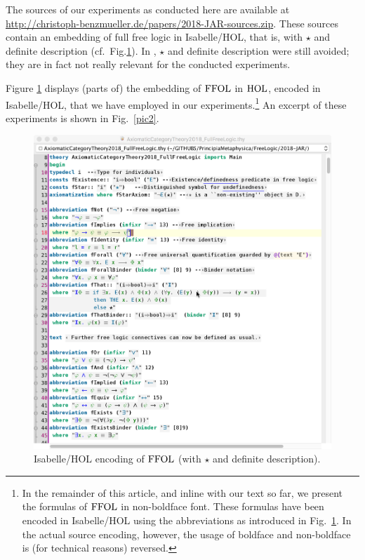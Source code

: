 The sources of our experiments as conducted here are available at
\url{http://christoph-benzmueller.de/papers/2018-JAR-sources.zip}.
These sources contain an embedding of full free logic in Isabelle/HOL,
that is, with $\star$ and definite description
(cf.~Fig.\ref{pic1}). In \cite{ArXiv}, $\star$ and definite
description were still avoided; they are in fact not really 
relevant for the conducted experiments.

Figure \ref{pic1} displays (parts of) the embedding of $\text{\textrm{FFOL}}$ in
$\text{\textrm{HOL}}$, encoded in Isabelle/HOL, that we have employed in our
experiments.\footnote{In the remainder of this article, and inline
  with our text so far,  we present the formulas of
  $\text{\textrm{FFOL}}$ in non-boldface font. These formulas have been encoded in Isabelle/HOL using the
  abbreviations as introduced in Fig.~\ref{pic1}. In the actual source
  encoding, however, the usage of boldface and non-boldface is
  (for technical reasons) reversed.} 
An excerpt of these experiments is shown in Fig.~\ref{pic2}.

\begin{figure}[htp]
 \includegraphics[width=\textwidth]{FFOL-Pic1}
 \caption{Isabelle/HOL encoding of $\text{\textrm{FFOL}}$ (with $\star$ and definite description). \label{pic1}}
\end{figure}

